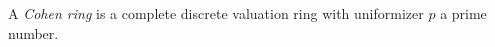 \begin{definition}
\label{definition-cohen-ring}
A {\it Cohen ring} is a complete discrete valuation ring with
uniformizer $p$ a prime number.
\end{definition}